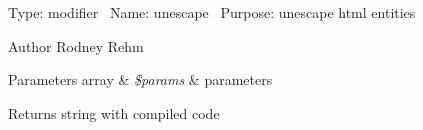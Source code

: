 Type\+: modifier~\newline
 Name\+: unescape~\newline
 Purpose\+: unescape html entities

\begin{DoxyAuthor}{Author}
Rodney Rehm 
\end{DoxyAuthor}

\begin{DoxyParams}[1]{Parameters}
array & {\em \$params} & parameters \\
\hline
\end{DoxyParams}
\begin{DoxyReturn}{Returns}
string with compiled code 
\end{DoxyReturn}
